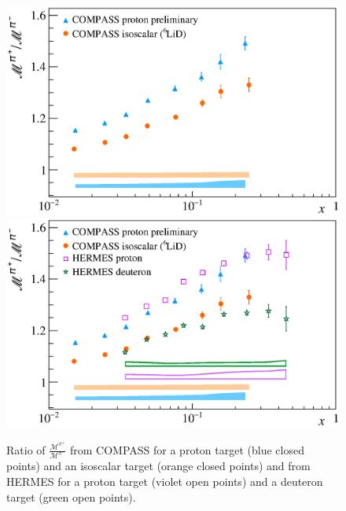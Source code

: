\begin{figure}[!h]
  \centering
	\includegraphics[scale=0.5]{./gfx/Mult_pi_ratio_noH.eps}
	\includegraphics[scale=0.5]{./gfx/Mult_pi_ratio.eps}
	\caption{Ratio of $\frac{\mathscr{M}^{\pi^+}}{\mathscr{M}^{\pi^-}}$ from COMPASS for a proton target (blue closed points) and an isoscalar target (orange closed points) and from HERMES for a proton target (violet open points) and a deuteron target (green open points).}
	\label{pic:piratio}
\end{figure}

